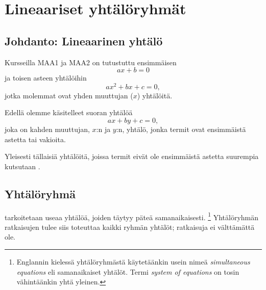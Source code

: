 \section{Lineaariset yhtälöryhmät} 


\subsection*{Johdanto: Lineaarinen yhtälö}

Kursseilla MAA1 ja MAA2 on tutustuttu ensimmäisen 
\[ax +b = 0\]
ja toisen asteen yhtälöihin
\[ax^2 + bx +c = 0,\]
jotka molemmat ovat yhden muuttujan ($x$) yhtälöitä.

Edellä olemme käsitelleet suoran yhtälöä
\[ax + by + c = 0,\]
joka on kahden muuttujan, $x$:n ja $y$:n, yhtälö, jonka termit ovat ensimmäistä astetta tai vakioita.

Yleisesti tällaisiä yhtälöitä, joissa termit eivät ole ensimmäistä astetta suurempia kutsutaan .


\subsection*{Yhtälöryhmä}

 tarkoitetaan useaa yhtälöä, joiden täytyy
päteä samanaikaisesti. \footnote{Englannin kielessä yhtälöryhmästä käytetäänkin usein nimeä 
  \emph{simultaneous equations} eli samanaikaiset yhtälöt.
  Termi \emph{system of equations} on tosin vähintäänkin yhtä yleinen.}
Yhtälöryhmän ratkaisujen tulee siis toteuttaa kaikki ryhmän yhtälöt; ratkaisuja ei välttämättä ole.

